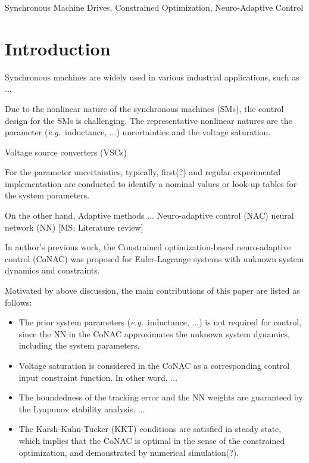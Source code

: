 \documentclass[conference]{IEEEtran}
\newcommand{\MSRY}[1]{{\color{red} [MS: #1]}} %
\newcommand\eg{\textit{e.g.\ }}
\begin{document}

\begin{IEEEkeywords}
	Synchronous Machine Drives, Constrained Optimization, Neuro-Adaptive Control
\end{IEEEkeywords}

\section{Introduction}

Synchronous machines are widely used in various industrial applications, such as ...

Due to the nonlinear nature of the synchronous machines (SMs), the control design for the SMs is challenging.
The representative nonlinear natures are the parameter (\eg inductance, ...) uncertainties and the voltage saturation.

Voltage source converters (VSCs)

For the parameter uncertainties, typically, first(?) and regular experimental implementation are conducted to identify a nominal values or look-up tables for the system parameters.

On the other hand, Adaptive methods ...
Neuro-adaptive control (NAC)
neural network (NN)
\MSRY{Literature review}

In author's previous work, the Constrained optimization-based neuro-adaptive control (CoNAC) was proposed for Euler-Lagrange systems with unknown system dynamics and constraints.

Motivated by above discussion, the main contributions of this paper are listed as follows:
\begin{itemize}
    \item The prior system parameters (\eg inductance, ...) is not required for control, since the NN in the CoNAC approximates the unknown system dynamics, including the system parameters.
    \item Voltage saturation is considered in the CoNAC as a corresponding control input constraint function. In other word, ...
    \item The boundedness of the tracking error and the NN weights are guaranteed by the Lyapunov stability analysis. ...
    \item The Karsh-Kuhn-Tucker (KKT) conditions are satisfied in steady state, which implies that the CoNAC is optimal in the sense of the constrained optimization, and demonstrated by numerical simulation(?).
\end{itemize}
\end{document}

